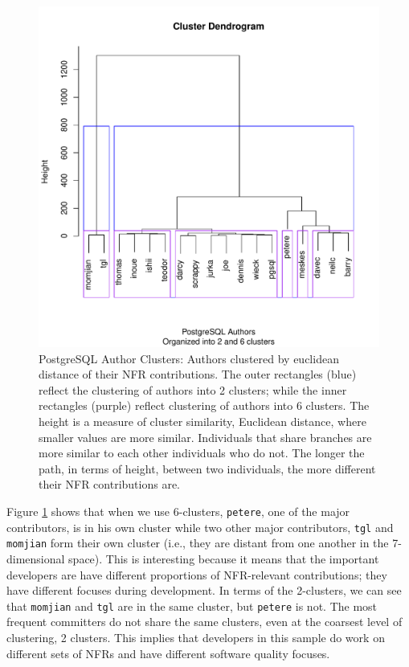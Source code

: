 \documentclass[smallextended]{svjour3}       %
\begin{document}
\begin{figure}
  \centering
  \includegraphics[width=.9\textwidth]{figures/postgresql-author-cluster}
  \caption{PostgreSQL Author Clusters: Authors clustered by euclidean
    distance of their NFR contributions. The outer rectangles (blue)
    reflect the clustering of authors into 2 clusters; while the inner rectangles
    (purple) reflect clustering of authors into 6 clusters. The height is a
    measure of cluster similarity, Euclidean distance, where smaller
    values are more similar. Individuals that share
    branches are more similar to each other individuals who do
    not. The longer the path, in terms of height, between two
    individuals, the more different their NFR contributions are.}
\label{fig:authorcluster}
\end{figure}


Figure \ref{fig:authorcluster} shows that when we use $6$-clusters, 
\texttt{petere}, one of the major contributors, is in his own cluster
while two other major contributors, \texttt{tgl} and \texttt{momjian}
form their own cluster (i.e., they are distant from one another in the
7-dimensional space). 
This is interesting because it means that the important developers are
have different proportions of NFR-relevant contributions; they have different
focuses during development. In terms of the 2-clusters, we can see that \texttt{momjian}
and \texttt{tgl} are in the same cluster, but \texttt{petere} is
not. The most frequent committers do not share the same clusters, even
at the coarsest level of clustering, 2 clusters.  This implies that developers in
this sample do work on different sets of NFRs and have different
software quality focuses.
\end{document}
